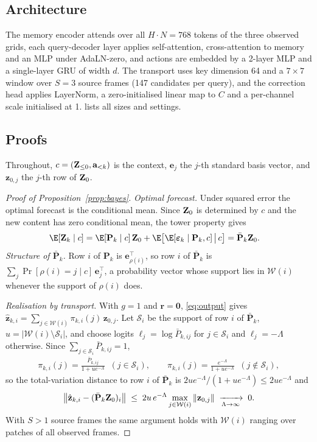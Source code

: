 \subsection{Architecture}\label{app:impl}
The memory encoder attends over all $H\cdot N{=}768$ tokens of the three observed grids, each query-decoder layer
applies self-attention, cross-attention to memory and an MLP under AdaLN-zero, and actions are embedded by a 2-layer MLP
and a single-layer GRU of width $d$.
%
The transport uses key dimension 64 and a $7{\times}7$ window over $S{=}3$ source frames (147 candidates per query), and
the correction head applies LayerNorm, a zero-initialised linear map to $C$ and a per-channel scale initialised at 1.
%
 lists all sizes and settings.

\subsection{Proofs}\label{app:proofs}
Throughout, $c=(\mathbf{Z}_{\le 0},\mathbf{a}_{<k})$ is the context, $\mathbf{e}_j$ the $j$-th standard basis vector, and
$\mathbf{z}_{0,j}$ the $j$-th row of $\mathbf{Z}_0$.

\begin{proof}[Proof of Proposition~\ref{prop:bayes}]
\emph{Optimal forecast.} Under squared error the optimal forecast is the conditional mean. Since $\mathbf{Z}_0$ is determined
by $c$ and the new content has zero conditional mean, the tower property gives
\begin{align}
\E[\Z_k\mid c]
  &= \E[\mathbf{P}_k\mid c]\,\Z_0+\E\big[\E[\bm{\varepsilon}_k\mid\mathbf{P}_k,c]\,\big|\,c\big]
   = \bar{\mathbf{P}}_k\Z_0 .
\end{align}
\emph{Structure of $\bar{\mathbf{P}}_k$.} Row $i$ of $\mathbf{P}_k$ is $\mathbf{e}_{\rho(i)}^{\top}$, so row $i$ of
$\bar{\mathbf{P}}_k$ is $\sum_{j}\Pr[\rho(i)=j\mid c]\,\mathbf{e}_j^{\top}$, a probability vector whose support lies in
$\mathcal{W}(i)$ whenever the support of $\rho(i)$ does.

\emph{Realisation by transport.} With $g=1$ and $\mathbf{r}=\mathbf{0}$, \cref{eq:output} gives
$\hat{\mathbf{z}}_{k,i}=\sum_{j\in\mathcal{W}(i)}\pi_{k,i}(j)\,\mathbf{z}_{0,j}$. Let $\mathcal{S}_i$ be the support of
row $i$ of $\bar{\mathbf{P}}_k$, $u=|\mathcal{W}(i)\setminus\mathcal{S}_i|$, and choose logits
$\ell_j=\log\bar{P}_{k,ij}$ for $j\in\mathcal{S}_i$ and $\ell_j=-\Lambda$ otherwise. Since $\sum_{j\in\mathcal{S}_i}\bar{P}_{k,ij}=1$,
\begin{align}
\pi_{k,i}(j)=\frac{\bar{P}_{k,ij}}{1+u e^{-\Lambda}}\;\;(j\in\mathcal{S}_i),\qquad
\pi_{k,i}(j)=\frac{e^{-\Lambda}}{1+u e^{-\Lambda}}\;\;(j\notin\mathcal{S}_i),
\end{align}
so the total-variation distance to row $i$ of $\bar{\mathbf{P}}_k$ is $2ue^{-\Lambda}/(1+ue^{-\Lambda})\le 2ue^{-\Lambda}$ and
\begin{align}
\big\|\hat{\mathbf{z}}_{k,i}-(\bar{\mathbf{P}}_k\mathbf{Z}_0)_i\big\|\;\le\;2u\,e^{-\Lambda}\max_{j\in\mathcal{W}(i)}\|\mathbf{z}_{0,j}\|
\;\xrightarrow[\Lambda\to\infty]{}\;0 .
\end{align}
With $S>1$ source frames the same argument holds with $\mathcal{W}(i)$ ranging over patches of all observed frames.
\end{proof}

